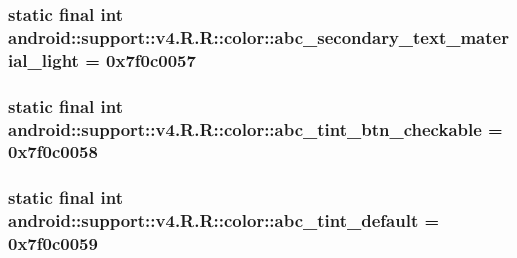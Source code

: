 \hypertarget{classandroid_1_1support_1_1v4_1_1_r_1_1color_fc61ba2a1722429171b7d33e4d8338aa}{
\subsubsection[{abc\_\-secondary\_\-text\_\-material\_\-light}]{\setlength{\rightskip}{0pt plus 5cm}static final int android::support::v4.R.R::color::abc\_\-secondary\_\-text\_\-material\_\-light = 0x7f0c0057}}
\label{classandroid_1_1support_1_1v4_1_1_r_1_1color_fc61ba2a1722429171b7d33e4d8338aa}


\hypertarget{classandroid_1_1support_1_1v4_1_1_r_1_1color_7f55aef0b7717f92b00f8ef0c046892f}{
\subsubsection[{abc\_\-tint\_\-btn\_\-checkable}]{\setlength{\rightskip}{0pt plus 5cm}static final int android::support::v4.R.R::color::abc\_\-tint\_\-btn\_\-checkable = 0x7f0c0058}}
\label{classandroid_1_1support_1_1v4_1_1_r_1_1color_7f55aef0b7717f92b00f8ef0c046892f}


\hypertarget{classandroid_1_1support_1_1v4_1_1_r_1_1color_689f6db9a50c8820a2c3fa1b27bd7068}{
\subsubsection[{abc\_\-tint\_\-default}]{\setlength{\rightskip}{0pt plus 5cm}static final int android::support::v4.R.R::color::abc\_\-tint\_\-default = 0x7f0c0059}}
\label{classandroid_1_1support_1_1v4_1_1_r_1_1color_689f6db9a50c8820a2c3fa1b27bd7068}


